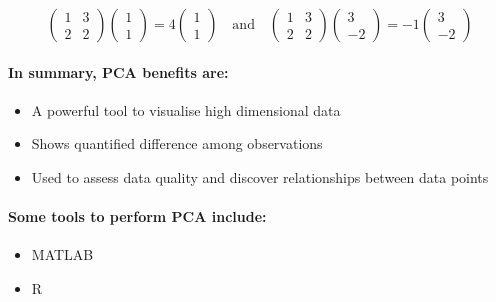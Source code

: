 \documentclass[11pt, oneside]{article}   	%
\begin{document}
\[ \left( \begin{array}{cc}
      1 & 3\\ 
      2 & 2
      \end{array} \right)
%
   \left( \begin{array}{c}
      1 \\ 
      1
      \end{array} \right)
%
   = 4
   \left( \begin{array}{c}
   1\\
   1
   \end{array} \right)
\text{~~~and~~~}
   \left( \begin{array}{cc}
   1 & 3\\
   2 & 2
   \end{array} \right)
%
   \left( \begin{array}{c}
   3\\
   -2
   \end{array} \right)
%
   =-1
   \left( \begin{array}{c}
   3\\
   -2
   \end{array} \right)
\]



\paragraph{In summary, PCA benefits are:}

\begin{itemize}

   \item A powerful tool to visualise high dimensional data 

   \item Shows quantified difference among observations

   \item Used to assess data quality and discover relationships between data points
\end{itemize}



\paragraph{Some tools to perform PCA include:}

\begin{itemize}
   \item MATLAB
   \item R
\end{itemize}
\end{document}
